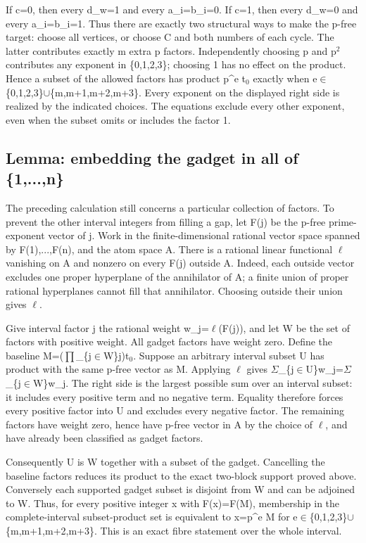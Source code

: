 \documentclass[11pt,a4paper]{article}
\begin{document}
If c=0, then every d\_w=1 and every a\_i=b\_i=0. If c=1, then every d\_w=0 and every a\_i=b\_i=1. Thus there are exactly two structural ways to make the p-free target: choose all vertices, or choose C and both numbers of each cycle. The latter contributes exactly m extra p factors. Independently choosing p and p\ensuremath{^2} contributes any exponent in \{0,1,2,3\}; choosing 1 has no effect on the product. Hence a subset of the allowed factors has product p\textasciicircum{}e t\ensuremath{_0} exactly when e\ensuremath{\in}\{0,1,2,3\}\ensuremath{\cup}\{m,m+1,m+2,m+3\}. Every exponent on the displayed right side is realized by the indicated choices. The equations exclude every other exponent, even when the subset omits or includes the factor 1.

\subsection{Lemma: embedding the gadget in all of \{1,...,n\}}
The preceding calculation still concerns a particular collection of factors. To prevent the other interval integers from filling a gap, let F(j) be the p-free prime-exponent vector of j. Work in the finite-dimensional rational vector space spanned by F(1),...,F(n), and the atom space A. There is a rational linear functional \ensuremath{\ell} vanishing on A and nonzero on every F(j) outside A. Indeed, each outside vector excludes one proper hyperplane of the annihilator of A; a finite union of proper rational hyperplanes cannot fill that annihilator. Choosing outside their union gives \ensuremath{\ell}.

Give interval factor j the rational weight w\_j=\ensuremath{\ell}(F(j)), and let W be the set of factors with positive weight. All gadget factors have weight zero. Define the baseline M=(\ensuremath{\prod}\_\{j\ensuremath{\in}W\}j)t\ensuremath{_0}. Suppose an arbitrary interval subset U has product with the same p-free vector as M. Applying \ensuremath{\ell} gives \ensuremath{\Sigma}\_\{j\ensuremath{\in}U\}w\_j=\ensuremath{\Sigma}\_\{j\ensuremath{\in}W\}w\_j. The right side is the largest possible sum over an interval subset: it includes every positive term and no negative term. Equality therefore forces every positive factor into U and excludes every negative factor. The remaining factors have weight zero, hence have p-free vector in A by the choice of \ensuremath{\ell}, and have already been classified as gadget factors.

Consequently U is W together with a subset of the gadget. Cancelling the baseline factors reduces its product to the exact two-block support proved above. Conversely each supported gadget subset is disjoint from W and can be adjoined to W. Thus, for every positive integer x with F(x)=F(M), membership in the complete-interval subset-product set is equivalent to x=p\textasciicircum{}e M for e\ensuremath{\in}\{0,1,2,3\}\ensuremath{\cup}\{m,m+1,m+2,m+3\}. This is an exact fibre statement over the whole interval.
\end{document}
